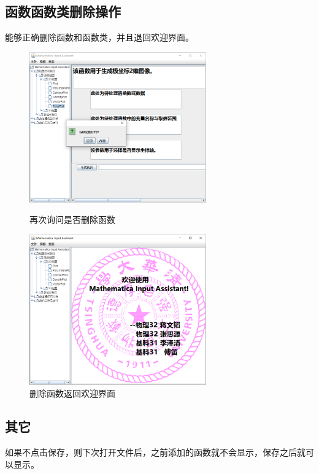 \documentclass[hyperref, UTF8
,bookmarksnumbered=true, oneside]{ctexbook}
\begin{document}
		\subsection{函数函数类删除操作} %
		能够正确删除函数和函数类，并且退回欢迎界面。
		\begin{figure}[!h]
	        \begin{minipage}[b]{0.45\textwidth}
	        \centering
	        \includegraphics[width=3in]{24.png}
	        \caption{再次询问是否删除函数}
	        \label{pic:MathPack}
	        \end{minipage}%
	        \hspace{0.1\textwidth}%
	        \begin{minipage}[b]{0.45\textwidth}
	        \centering
	        \includegraphics[width=3in]{25.png}
	        \caption{删除函数返回欢迎界面}
	        \label{pic:GUIPack}
	        \end{minipage}
        \end{figure}
		

		\subsection{其它} %
		如果不点击保存，则下次打开文件后，之前添加的函数就不会显示，保存之后就可以显示。
		
\end{document}
